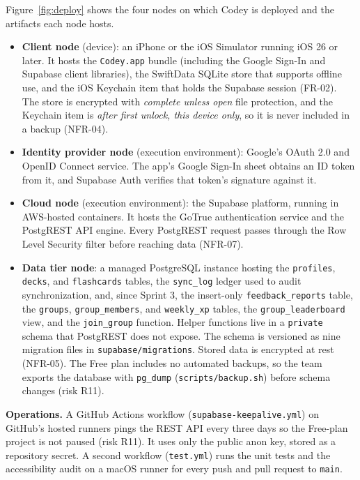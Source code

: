 \documentclass[12pt,letterpaper]{article}
\newcommand{\st}[1]{\guillemotleft#1\guillemotright}   %
\begin{document}
Figure~\ref{fig:deploy} shows the four nodes on which Codey is deployed and the
artifacts each node hosts.
\begin{itemize}
  \item \textbf{Client node} (\st{device}): an iPhone or the iOS Simulator running
        iOS 26 or later. It hosts the \texttt{Codey.app} bundle (including the Google
        Sign-In and Supabase client libraries), the SwiftData SQLite store that
        supports offline use, and the iOS Keychain item that holds the Supabase
        session (FR-02). The store is encrypted with \emph{complete unless open} file
        protection, and the Keychain item is \emph{after first unlock, this device
        only}, so it is never included in a backup (NFR-04).
  \item \textbf{Identity provider node} (\st{execution environment}): Google's OAuth
        2.0 and OpenID Connect service. The app's Google Sign-In sheet obtains an ID
        token from it, and Supabase Auth verifies that token's signature against it.
  \item \textbf{Cloud node} (\st{execution environment}): the Supabase platform,
        running in AWS-hosted containers. It hosts the GoTrue authentication service
        and the PostgREST API engine. Every PostgREST request passes through the Row
        Level Security filter before reaching data (NFR-07).
  \item \textbf{Data tier node}: a managed PostgreSQL instance hosting the
        \texttt{profiles}, \texttt{decks}, and \texttt{flashcards} tables, the
        \texttt{sync\_log} ledger used to audit synchronization, and, since Sprint 3,
        the insert-only \texttt{feedback\_reports} table, the \texttt{groups},
        \texttt{group\_members}, and \texttt{weekly\_xp} tables, the
        \texttt{group\_leaderboard} view, and the \texttt{join\_group} function. Helper
        functions live in a \texttt{private} schema that PostgREST does not expose. The
        schema is versioned as nine migration files in \texttt{supabase/migrations}. Stored data is
        encrypted at rest (NFR-05). The Free plan includes no automated backups, so
        the team exports the database with \texttt{pg\_dump}
        (\texttt{scripts/backup.sh}) before schema changes (risk R11).
\end{itemize}

\textbf{Operations.} A GitHub Actions workflow (\texttt{supabase-keepalive.yml}) on
GitHub's hosted runners pings the REST API every three days so the Free-plan project is
not paused (risk R11). It uses only the public anon key, stored as a repository
secret. A second workflow (\texttt{test.yml}) runs the unit tests and the accessibility
audit on a macOS runner for every push and pull request to \texttt{main}.
\end{document}
